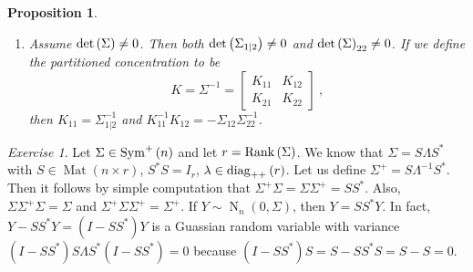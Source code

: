 \documentclass[12pt,a4paper]{amsart}
\newcommand{\MRof}[2]{\operatorname{Mat}\left(#1\times#2\right)}
\newcommand{\gaussian}[3]{\operatorname{N}_{#1}\left(#2,#3\right)}
\newcommand{\ppdiag}[1]{\diag_{++}\left(#1\right)}
\theoremstyle{plain}%
\newtheorem{proposition}[thm]{Proposition}
\theoremstyle{definition}
\theoremstyle{remark}
\newtheorem{exercise}{Exercise}
\begin{document}
\begin{proposition}
\begin{enumerate}
\begin{multline*}
\begin{bmatrix}
    I & -\Sigma_{12}\Sigma_{22}^+ \\ 0 & I
  \end{bmatrix}
  \begin{bmatrix}
      \Sigma_{11} & \Sigma_{12} \\ \Sigma_{21} & \Sigma_{22}
    \end{bmatrix}
  \begin{bmatrix}
    I & 0 \\ -\Sigma_{22}^+\Sigma_{21} & I
  \end{bmatrix} = 
\\
   \begin{bmatrix}
    \Sigma_{11} - \Sigma_{12}\Sigma_{22}^+ \Sigma_{21} & 0 \\ \Sigma_{21} & \Sigma_{22}
  \end{bmatrix}
  \begin{bmatrix}
    I & 0 \\ -\Sigma_{22}^+\Sigma_{21} & I
  \end{bmatrix} =  \\
  \begin{bmatrix}
    \Sigma_{11} - \Sigma_{12}\Sigma_{22}^+\Sigma_{21} & 0 \\ 0 & \Sigma_{22}
  \end{bmatrix} \ ,
\end{multline*}
hence the last matrix is non-negative definite. The Shur complement of the partitioned covariance matrix $\Sigma$ is 
\begin{equation*}
  \Sigma_{1|2} = \Sigma_{11} - \Sigma_{12}\Sigma_{22}^+ \Sigma_{21} \in \psym {n_1}\ .
\end{equation*}

\item Assume $\operatorname{det}\left(\Sigma\right) \ne 0$. Then both $\operatorname{det}\left(\Sigma_{1|2}\right) \ne 0$ and $\operatorname{det}\left(\Sigma\right)_{22} \ne 0$. If we define the partitioned \emph{concentration} to be
  \begin{equation*}
    K = \Sigma^{-1} =
    \begin{bmatrix}
      K_{11} & K_{12} \\ K_{21} & K_{22}
    \end{bmatrix} \ ,
  \end{equation*}
then $K_{11} = \Sigma_{1|2}^{-1}$ and $K_{11}^{-1} K_{12} = - \Sigma_{12}\Sigma_{22}^{-1}$.
\end{enumerate}
\end{proposition}

\begin{exercise}\label{ex:1}
Let $\Sigma \in \operatorname{Sym}^{+}\left(n\right)$ and let $r = \operatorname{Rank}\left(\Sigma\right)$. We know that $\Sigma = S\Lambda S^*$ with $S \in \MRof n r$, $S^*S = I_r$, $\lambda \in \ppdiag r$. Let us define $\Sigma^+ = S \Lambda^{-1} S^*$. Then it follows by simple computation that  $\Sigma^+\Sigma=\Sigma\Sigma^+ = SS^*$. Also, $\Sigma\Sigma^+\Sigma = \Sigma$ and $\Sigma^+\Sigma\Sigma^+=\Sigma^+$. If $Y \sim \gaussian n 0 \Sigma$, then $Y = SS^*Y$. In fact, $Y - SS^*Y = (I - SS^*)Y$ is a Guassian random variable with variance $(I - SS^*)S\Lambda S^*(I-SS^*) = 0$ because $(I-SS^*)S = S - S S^* S = S-S = 0$.  
\end{exercise}
\end{document}
